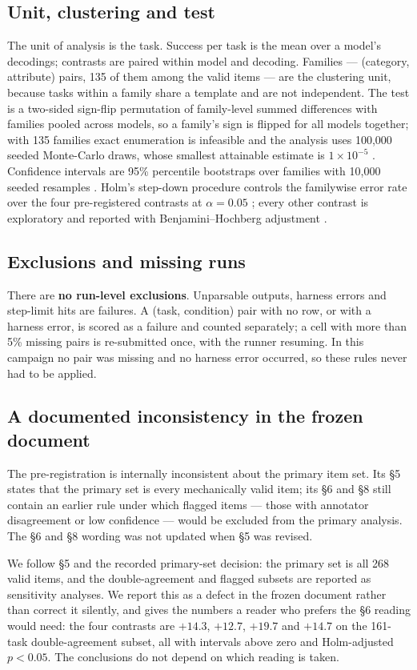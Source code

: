\subsection{Unit, clustering and test}

The unit of analysis is the task. Success per task is the mean over a model's decodings; contrasts are paired
within model and decoding. Families --- (category, attribute) pairs, 135 of them among the valid items --- are the
clustering unit, because tasks within a family share a template and are not independent. The test is a two-sided
sign-flip permutation of family-level summed differences with families pooled across models, so a family's sign is
flipped for all models together; with 135 families exact enumeration is infeasible and the analysis uses 100{,}000
seeded Monte-Carlo draws, whose smallest attainable estimate is $1\times10^{-5}$
\citep{good2005permutation}. Confidence intervals are 95\% percentile bootstraps over families with 10{,}000
seeded resamples \citep{efron1979bootstrap,field2007clustered}. Holm's step-down procedure controls the familywise
error rate over the four pre-registered contrasts at $\alpha=0.05$ \citep{holm1979simple}; every other contrast is
exploratory and reported with Benjamini--Hochberg adjustment \citep{benjamini1995fdr}.

\subsection{Exclusions and missing runs}

There are \textbf{no run-level exclusions}. Unparsable outputs, harness errors and step-limit hits are failures. A
(task, condition) pair with no row, or with a harness error, is scored as a failure and counted separately; a cell
with more than 5\% missing pairs is re-submitted once, with the runner resuming. In this campaign no pair was
missing and no harness error occurred, so these rules never had to be applied.

\subsection{A documented inconsistency in the frozen document}

The pre-registration is internally inconsistent about the primary item set. Its \S5 states that the primary set is
every mechanically valid item; its \S6 and \S8 still contain an earlier rule under which flagged items --- those
with annotator disagreement or low confidence --- would be excluded from the primary analysis. The \S6 and \S8
wording was not updated when \S5 was revised.

We follow \S5 and the recorded primary-set decision: the primary set is all 268 valid items, and the
double-agreement and flagged subsets are reported as sensitivity analyses. We report this as a defect in the frozen
document rather than correct it silently, and  gives the numbers a reader who prefers the
\S6 reading would need: the four contrasts are $+14.3$, $+12.7$, $+19.7$ and $+14.7$\pp{} on the 161-task
double-agreement subset, all with intervals above zero and Holm-adjusted $p<0.05$. The conclusions do not depend
on which reading is taken.

